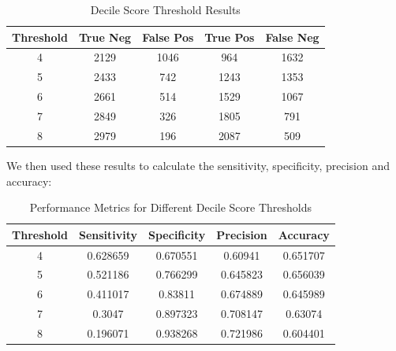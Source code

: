 \begin{table}[h!] \centering \begin{tabular}{|c|c|c|c|c|} \hline 
		\textbf{Threshold} & \textbf{True Neg} & \textbf{False Pos} & \textbf{True Pos} & \textbf{False Neg} \\ \hline 
		4                               & 2129                   & 1046                    & 964                    & 1632                    \\ \hline 5                               & 2433                   & 742                     & 1243                   & 1353                    \\ \hline 6                               & 2661                   & 514                     & 1529                   & 1067                    \\ \hline 7                               & 2849                   & 326                     & 1805                   & 791                     \\ \hline 8                               & 2979                   & 196                     & 2087                   & 509                     \\ \hline \end{tabular} \caption{Decile Score Threshold Results} \label{tab:decile_scores} \end{table}

We then used these results to calculate the sensitivity, specificity, precision and accuracy:

\begin{table}[h!]
	\centering
	\begin{tabular}{|c|c|c|c|c|}
		\hline
		\textbf{Threshold} & \textbf{Sensitivity} & \textbf{Specificity} & \textbf{Precision} & \textbf{Accuracy} \\ \hline
		4                               & 0.628659             & 0.670551             & 0.60941            & 0.651707          \\ \hline
		5                               & 0.521186             & 0.766299             & 0.645823           & 0.656039          \\ \hline
		6                               & 0.411017             & 0.83811              & 0.674889           & 0.645989          \\ \hline
		7                               & 0.3047               & 0.897323             & 0.708147           & 0.63074           \\ \hline
		8                               & 0.196071             & 0.938268             & 0.721986           & 0.604401          \\ \hline
	\end{tabular}
	\caption{Performance Metrics for Different Decile Score Thresholds}
	\label{tab:performance_metrics}
\end{table}

